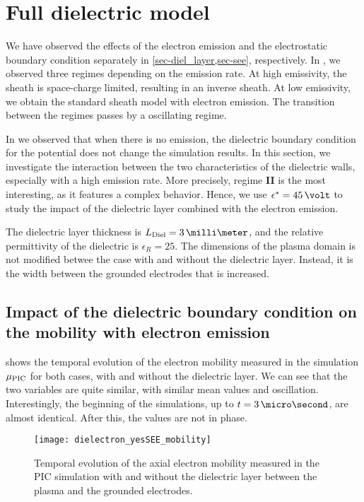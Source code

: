 
\section{Full dielectric model }
  \label{sec-fulldiel}
  
  We have observed the effects of the electron emission and the electrostatic boundary condition separately in \cref{sec-diel_layer,sec-see}, respectively.  
  In , we observed three regimes depending on the emission rate.
  At high emissivity, the sheath is space-charge limited, resulting in an inverse sheath.
  At low emissivity, we obtain the standard sheath model with electron emission.
  The transition between the regimes passes by a oscillating regime.
  
  In  we observed that when there is no emission, the dielectric boundary condition for the potential does not change the simulation results.
  In this section, we investigate the interaction between the two characteristics of the dielectric walls, especially with a high emission rate.
  More precisely, regime {\bf II} is the most interesting, as it features a complex behavior.
  Hence, we use $\crover=45\,\volt$ to study the impact of the dielectric layer combined with the electron emission.
  
  The dielectric layer thickness is $L_{\rm Diel} = 3\,\milli\meter$, and the relative permittivity of the dielectric is $\epsilon_R=25$.
  The dimensions of the plasma domain is not modified betwee the case with and without the dielectric layer.
  Instead, it is the width between the grounded electrodes that is increased.
  
  \subsection{Impact of the dielectric boundary condition on the mobility with electron emission}
    
     shows the temporal evolution of the electron mobility measured in the simulation $\mu_{\mathrm{PIC}}$ for both cases, with and without the dielectric layer.
    We can see that the two variables are quite similar, with similar mean values and oscillation.
    Interestingly, the beginning of the simulations, up to $t=3\,\micro\second$, are almost identical.
    After this, the values are not in phase.
    
    \begin{figure}[hbtp]
      \centering
      \texttt{[image: dielectron\_yesSEE\_mobility]}
      \caption{Temporal evolution of the axial electron mobility measured in the \ac{PIC} simulation with and without the dielectric layer between the plasma and the grounded electrodes. }
      \label{fig-temporal_mu} 
    \end{figure}
    
